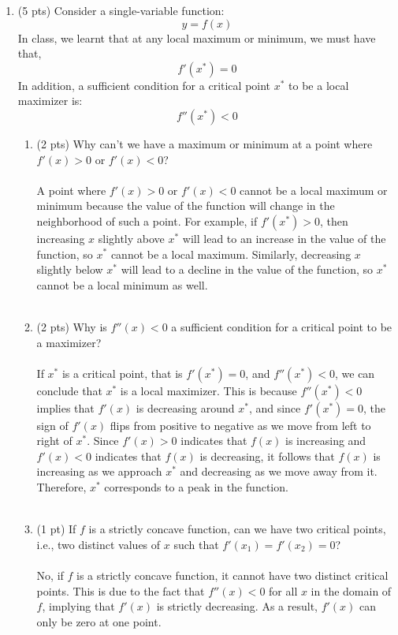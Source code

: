 \documentclass{./../../Latex/tests}
\begin{document}
\begin{enumerate}
\item (5 pts) Consider a single-variable function:
 $$ y = f(x) $$
 In class, we learnt that at any local maximum or minimum, we must have that, 
 $$ f'(x^*) = 0 $$
 In addition, a sufficient condition for a critical point $x^*$ to be a local maximizer is:
 $$ f''(x^*) <0 $$ 
 \begin{enumerate}
  \item (2 pts) Why can't we have a maximum or minimum at a point where $f'(x)>0$ or $f'(x)<0$? \\~\\
  A point where $f'(x)>0$ or $f'(x)<0$ cannot be a local maximum or minimum because the value of the function will change in the neighborhood of such a point. For example, if $f'(x^*)>0$, then increasing $x$ slightly above $x^*$ will lead to an increase in the value of the function, so $x^*$ cannot be a local maximum. Similarly, decreasing $x$ slightly below $x^*$ will lead to a decline in the value of the function, so $x^*$ cannot be a local minimum as well. \\~\\
  \item (2 pts) Why is $f''(x) <0$ a sufficient condition for a critical point to be a maximizer? \\~\\
If $x^*$ is a critical point, that is $f'(x^*)=0$, and $f''(x^*)<0$, we can conclude that $x^*$ is a local maximizer. This is because $f''(x^*)<0$ implies that $f'(x)$ is decreasing around $x^*$, and since $f'(x^*)=0$, the sign of $f'(x)$ flips from positive to negative as we move from left to right of $x^*$. Since $f'(x)>0$ indicates that $f(x)$ is increasing and $f'(x)<0$ indicates that $f(x)$ is decreasing, it follows that $f(x)$ is increasing as we approach $x^*$ and decreasing as we move away from it. Therefore, $x^*$ corresponds to a peak in the function. \\~\\
  \item (1 pt) If $f$ is a strictly concave function, can we have two critical points, i.e., two distinct values of $x$ such that $f'(x_1) = f'(x_2) = 0$? \\~\\
No, if $f$ is a strictly concave function, it cannot have two distinct critical points. This is due to the fact that $f''(x)<0$ for all $x$ in the domain of $f$, implying that $f'(x)$ is strictly decreasing. As a result, $f'(x)$ can only be zero at one point.
\end{enumerate}



\end{enumerate}
\end{document}

